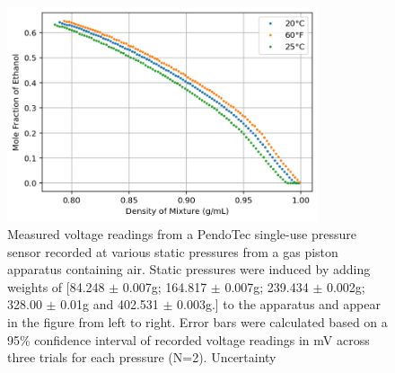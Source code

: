 \documentclass[lettersize,journal]{IEEEtran}
\begin{document}
	\begin{figure}[!t]
		\centering
		\includegraphics[width=3.6in]{fig1}
		\caption{Measured voltage readings from a PendoTec single-use pressure sensor recorded at various static pressures from a gas piston apparatus containing air. Static pressures were induced by adding weights of [84.248 $\pm$ 0.007g; 164.817 $\pm$ 0.007g; 239.434 $\pm$ 0.002g; 328.00 $\pm$ 0.01g and 402.531 $\pm$ 0.003g.] to the apparatus and appear in the figure from left to right. Error bars were calculated based on a 95\% confidence interval of recorded voltage readings in mV across three trials for each pressure (N=2). Uncertainty }
		\label{fig_1}
	\end{figure}
\end{document}
